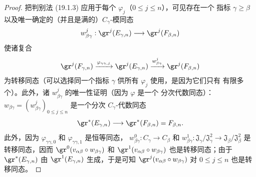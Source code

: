\begin{proof}
把判别法 (19.1.3) 应用于每个 $\varphi_j$（$0\leq j\leq n$），可见存在一个
指标 $\gamma\geq\beta$ 以及唯一确定的（并且是满的）$C_\gamma$-模同态
\[
  w_{\beta\gamma}^j:\gr^j(E_{\gamma,n})\longrightarrow
  \gr^j(F_{\beta,n})
\]
使诸复合
\[
  \gr^j(F_{\gamma,n})
  \xrightarrow{\varphi_{\gamma\gamma,j}}\gr^j(E_{\gamma,n})
  \xrightarrow{w_{\beta\gamma}^j}\gr^j(F_{\beta,n})
\]
为转移同态（可以选择同一个指标 $\gamma$ 供所有 $\varphi_j$ 使用，是因为它们只有
有限多个）。此外，诸 $w_{\beta\gamma}^j$ 的唯一性证明（因为 $\varphi$ 是一个
分次代数同态）：
$w_{\beta\gamma}=(w_{\beta\gamma}^j)_{0\leq j\leq n}$ 是一个分次
$C_\gamma$-代数同态
\[
  \gr^*(E_{\gamma,n})\longrightarrow
  \gr^*(F_{\beta,n})=F_{\beta,n}.
\]
此外，因为 $\varphi_{\gamma\gamma,0}$ 和 $\varphi_{\gamma\gamma,1}$ 是恒等同态，
$w_{\beta\gamma}^0:C_\gamma\to C_\beta$ 和
$w_{\beta\gamma}^1:\mathfrak J_\gamma/\mathfrak J_\gamma^2
\to\mathfrak J_\beta/\mathfrak J_\beta^2$ 是转移同态，因而
$\gr^0(v_{\alpha\beta}\circ w_{\beta\gamma})$ 和
$\gr^1(v_{\alpha\beta}\circ w_{\beta\gamma})$ 也是转移同态；由于
$\gr^*(E_{\gamma,n})$ 由 $\gr^1(E_{\gamma,n})$ 生成，于是可知
$\gr^j(v_{\alpha\beta}\circ w_{\beta\gamma})$ 对 $0\leq j\leq n$ 也是转移同态。


\end{proof}
